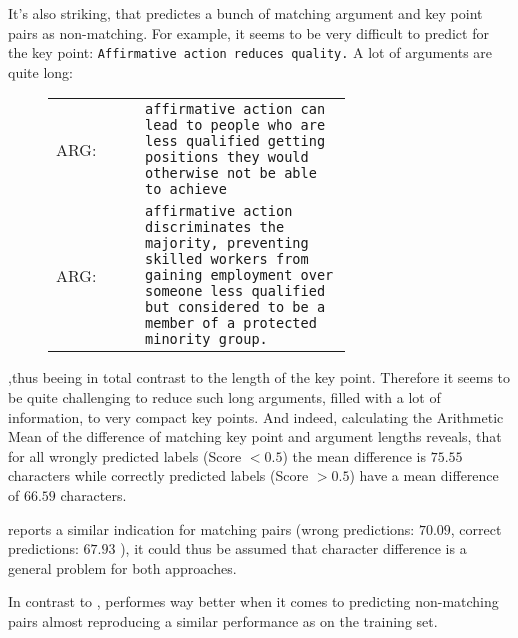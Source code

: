 It's also striking, that \Bert predictes a bunch of matching argument and key point pairs as non-matching. For example, 
it seems to be very difficult to predict for the key point: \texttt{Affirmative action reduces quality.} A lot of 
arguments are quite long:\\

\begin{figure}[H]
    \begin{tabularx}{\linewidth}{lp{0.7\linewidth}}
            ARG: & \texttt{affirmative action can lead to people who are less qualified getting positions they would otherwise not be able to achieve}\\
            ARG: & \texttt{affirmative action discriminates the majority, preventing skilled workers from gaining employment over someone less qualified but considered to be a member of a protected minority group.}
    \end{tabularx}
\end{figure}

,thus beeing in total contrast to the length of the key point. Therefore it seems to be quite challenging to reduce 
such long arguments, filled with a lot of information, to very compact key points. And indeed, 
calculating the Arithmetic Mean of the difference of matching key point and argument lengths reveals, that 
for all wrongly predicted labels (Score $< 0.5$) the mean difference is $75.55$ characters while 
correctly predicted labels (Score $> 0.5$) have a mean difference of $66.59$ characters.

\Roberta reports a similar indication for matching pairs (wrong predictions: $70.09$, correct predictions: $67.93$ ), 
it could thus be assumed that character difference is a general problem for both approaches. 

In contrast to \Bert, \Roberta performes way better when it comes to predicting non-matching pairs
almost reproducing a similar performance as on the training set.

